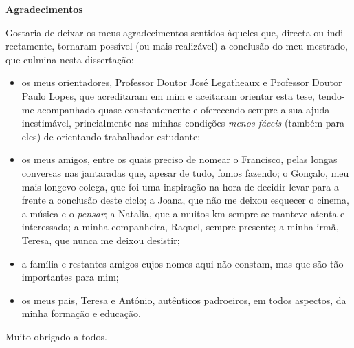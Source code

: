
\cleardoublepage\thispagestyle{plain}

\begin{otherlanguage}{portuguese}
  \textbf{\Large Agradecimentos}

  Gostaria de deixar os meus agradecimentos sentidos àqueles que, directa ou indirectamente, tornaram possível (ou mais realizável) a conclusão do meu mestrado, que culmina nesta dissertação:
  \begin{itemize}
    \item os meus orientadores, Professor Doutor José Legatheaux e Professor Doutor Paulo Lopes, que acreditaram em mim e aceitaram orientar esta tese, tendo-me acompanhado quase constantemente e oferecendo sempre a sua ajuda inestimável, princialmente nas minhas condições \emph{menos fáceis} (também para eles) de orientando trabalhador-estudante;
    \item os meus amigos, entre os quais preciso de nomear o Francisco, pelas longas conversas nas jantaradas que, apesar de tudo, fomos fazendo; o Gonçalo, meu mais longevo colega, que foi uma inspiração na hora de decidir levar para a frente a conclusão deste ciclo; a Joana, que não me deixou esquecer o cinema, a música e o \emph{pensar}; a Natalia, que a muitos km sempre se manteve atenta e interessada; a minha companheira, Raquel, sempre presente; a minha irmã, Teresa, que nunca me deixou desistir;
    \item a família e restantes amigos cujos nomes aqui não constam, mas que são tão importantes para mim;
    \item os meus pais, Teresa e António, autênticos padroeiros, em todos aspectos, da minha formação e educação.
  \end{itemize}

  Muito obrigado a todos.
\end{otherlanguage}
